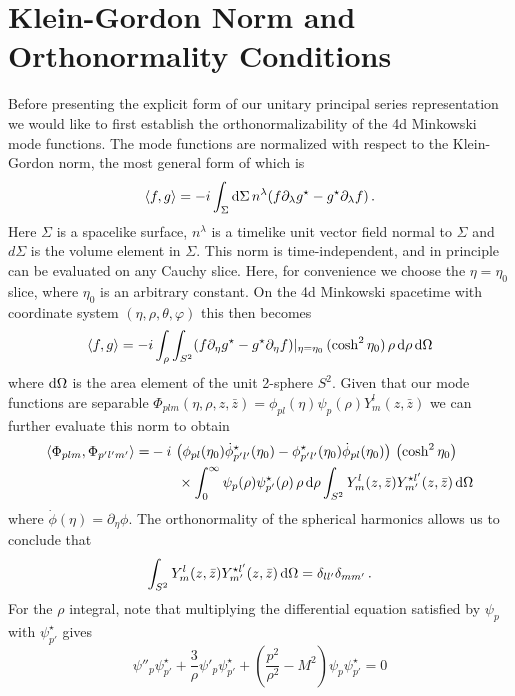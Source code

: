 \documentclass{brownthesis}
\def\dd{{\rm d}}
\begin{document}
\section{Klein-Gordon Norm and Orthonormality Conditions}

\label{sec:norm}

Before presenting the explicit form of our unitary principal series
representation we would like to first establish the orthonormalizability
of the 4d Minkowski mode functions. The mode functions are normalized
with respect to the Klein-Gordon norm, the most general form of which
is \cite{birrell1984quantum}
\begin{equation}
\langle f,g\rangle=-i\int_{\Sigma}\dd\Sigma\,n^{\lambda}(f\partial_{\lambda}g^{\star}-g^{\star}\partial_{\lambda}f)\,.\label{eq:kgnorm}
\end{equation}
Here $\Sigma$ is a spacelike surface, $n^{\lambda}$ is a timelike
unit vector field normal to $\Sigma$ and $d\Sigma$ is the volume
element in $\Sigma$. This norm is time-independent, and in principle
can be evaluated on any Cauchy slice. Here, for convenience we choose
the $\eta=\eta_{0}$ slice, where $\eta_{0}$ is an arbitrary constant.
On the 4d Minkowski spacetime with coordinate system $(\eta,\rho,\theta,\varphi)$
this then becomes
\[
\langle f,g\rangle=-i\int_{\rho}\int_{S^{2}}(f\partial_{\eta}g^{\star}-g^{\star}\partial_{\eta}f)|_{\eta=\eta_{0}}\,(\cosh^{2}\eta_{0})\,\rho\,\dd\rho\,\dd\Omega
\]
where $\dd\Omega$ is the area element of the unit 2-sphere $S^{2}$.
Given that our mode functions are separable $\Phi_{plm}(\eta,\rho,z,\bar{z})=\phi_{pl}(\eta)\psi_{p}(\rho)Y_{m}^{l}(z,\bar{z})$
we can further evaluate this norm to obtain
\begin{align*}
\langle\Phi_{plm},\Phi_{p'l'm'}\rangle= & -i\,\left(\phi_{pl}(\eta_{0})\dot{\phi}_{p'l'}^{\star}(\eta_{0})-\phi_{p'l'}^{\star}(\eta_{0})\dot{\phi}{}_{pl}(\eta_{0})\right)\,\left(\cosh^{2}\eta_{0}\right)\\
 & \qquad\times\int_{0}^{\infty}\psi_{p}(\rho)\psi_{p'}^{\star}(\rho)\,\rho\,\dd\rho\int_{S^{2}}Y_{m}^{l}(z,\bar{z})Y_{m'}^{\star l'}(z,\bar{z})\,\dd\Omega
\end{align*}
where $\dot{\phi}(\eta)=\partial_{\eta}\phi$. The orthonormality
of the spherical harmonics allows us to conclude that
\[
\int_{S^{2}}Y_{m}^{l}(z,\bar{z})Y_{m'}^{\star l'}(z,\bar{z})\,\dd\Omega=\delta_{ll'}\delta_{mm'}\,.
\]
For the $\rho$ integral, note that multiplying the differential equation
satisfied by $\psi_{p}$ with $\psi_{p'}^{\star}$ gives
\[
\psi''_{p}\psi_{p'}^{\star}+\frac{3}{\rho}\psi'_{p}\psi_{p'}^{\star}+\left(\frac{p^{2}}{\rho^{2}}-M^{2}\right)\psi_{p}\psi_{p'}^{\star}=0
\]
\end{document}
